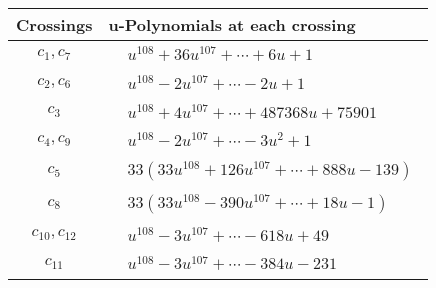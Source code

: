 \documentclass[1p]{elsarticle_modified}
\theoremstyle{definition}
\begin{document}
\begin{tabular}{m{50pt}|m{274pt}}
Crossings & \hspace{64pt}u-Polynomials at each crossing \\
\hline $$\begin{aligned}c_{1},c_{7}\end{aligned}$$&$\begin{aligned}
&u^{108}+36 u^{107}+\cdots+6 u+1
\end{aligned}$\\
\hline $$\begin{aligned}c_{2},c_{6}\end{aligned}$$&$\begin{aligned}
&u^{108}-2 u^{107}+\cdots-2 u+1
\end{aligned}$\\
\hline $$\begin{aligned}c_{3}\end{aligned}$$&$\begin{aligned}
&u^{108}+4 u^{107}+\cdots+487368 u+75901
\end{aligned}$\\
\hline $$\begin{aligned}c_{4},c_{9}\end{aligned}$$&$\begin{aligned}
&u^{108}-2 u^{107}+\cdots-3 u^2+1
\end{aligned}$\\
\hline $$\begin{aligned}c_{5}\end{aligned}$$&$\begin{aligned}
&33(33 u^{108}+126 u^{107}+\cdots+888 u-139)
\end{aligned}$\\
\hline $$\begin{aligned}c_{8}\end{aligned}$$&$\begin{aligned}
&33(33 u^{108}-390 u^{107}+\cdots+18 u-1)
\end{aligned}$\\
\hline $$\begin{aligned}c_{10},c_{12}\end{aligned}$$&$\begin{aligned}
&u^{108}-3 u^{107}+\cdots-618 u+49
\end{aligned}$\\
\hline $$\begin{aligned}c_{11}\end{aligned}$$&$\begin{aligned}
&u^{108}-3 u^{107}+\cdots-384 u-231
\end{aligned}$\\
\hline
\end{tabular}\\~\\
\end{document}
